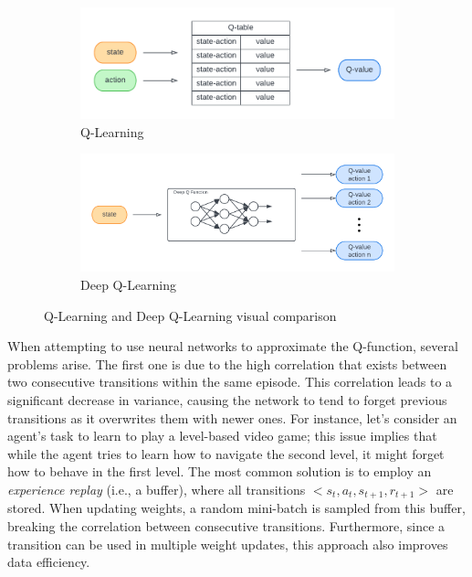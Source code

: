 \documentclass[12pt,a4paper,openright,twoside]{book}
\begin{document}
\begin{figure}[t]
    \begin{subfigure}[b]{0.49\textwidth}
        \centering
        \includegraphics[width=\textwidth]{figures/q-learning.pdf}
        \caption{Q-Learning}
        \label{fig:ql}
    \end{subfigure}
    \begin{subfigure}[b]{0.49\textwidth}
        \centering
        \includegraphics[width=\textwidth]{figures/deepQL.pdf}
        \caption{Deep Q-Learning}
        \label{fig:dqn}
    \end{subfigure}
\caption{Q-Learning and Deep Q-Learning visual comparison}\vspace{-10pt}
\label{fig:qlvsdqn}
\end{figure}

When attempting to use neural networks to approximate the Q-function, several problems arise. 
    The first one is due to the high correlation that exists between two consecutive transitions within the same 
    episode. This correlation leads to a significant decrease in variance, causing the network to tend to forget 
    previous transitions as it overwrites them with newer ones. For instance, let's consider an agent's task to 
    learn to play a level-based video game; this issue implies that while the agent tries to learn how to navigate 
    the second level, it might forget how to behave in the first level. The most common solution is to employ an 
    \emph{experience replay} (i.e., a buffer), where all transitions $<s_t, a_t, s_{t+1}, r_{t+1}>$ are stored. 
    When updating weights, a random mini-batch is sampled from this buffer, breaking the correlation between consecutive
    transitions. Furthermore, since a transition can be used in multiple weight updates, this approach also 
    improves data efficiency.
\end{document}
